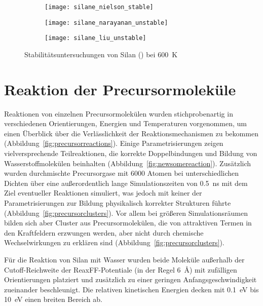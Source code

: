 \begin{figure}[b!h]

  \captionsetup[subfigure]{singlelinecheck=false}
  \def\subfigwidth{0.32\textwidth}
  \begin{subfigure}[t]{3.5cm}
    \texttt{[image: silane\_nielson\_stable]}
  \end{subfigure}
  \hfill
  \begin{subfigure}[t]{4.5cm}
    \texttt{[image: silane\_narayanan\_unstable]}
  \end{subfigure}
  \hfill
  \begin{subfigure}[t]{5cm}
    \texttt{[image: silane\_liu\_unstable]}
  \end{subfigure}

  \caption{Stabilitätsuntersuchungen von Silan () bei \SI{600}{\kelvin}}
  \label{fig:silanestability}

\end{figure}

\section{Reaktion der Precursormoleküle}

Reaktionen von einzelnen Precursormolekülen wurden stichprobenartig in verschiedenen Orientierungen, Energien und Temperaturen vorgenommen, um einen Überblick über die Verlässlichkeit der Reaktionsmechanismen zu bekommen (Abbildung~\ref{fig:precursorreactions}).
Einige Parametrisierungen zeigen vielversprechende Teilreaktionen, die korrekte Doppelbindungen und Bildung von Wasserstoffmolekülen beinhalten (Abbildung~\ref{fig:newsomereaction}).
Zusätzlich wurden durchmischte Precursorgase mit \num{6000} Atomen bei unterschiedlichen Dichten über eine außerordentlich lange Simulationszeiten von \SI{0.5}{\nano\second} mit dem Ziel eventueller Reaktionen simuliert, was jedoch mit keiner der Parametrisierungen zur Bildung physikalisch korrekter Strukturen führte (Abbildung~\ref{fig:precursorclusters}).
Vor allem bei größeren Simulationsräumen bilden sich aber Cluster aus Precursormolekülen, die von attraktiven Termen in den Kraftfeldern erzwungen werden, aber nicht durch chemische Wechselwirkungen zu erklären sind (Abbildung~\ref{fig:precursorclusters}).

Für die Reaktion von Silan mit Wasser wurden beide Moleküle außerhalb der Cutoff-Reich\-weite der ReaxFF-Potentiale (in der Regel \SI{6}{\angstrom}) mit zufälligen Orientierungen platziert und zusätzlich zu einer geringen Anfangsgeschwindigkeit zueinander beschleunigt.
Die relativen kinetischen Energien decken mit \SI{0.1}{\electronvolt} bis \SI{10}{\electronvolt}  einen breiten Bereich ab.

